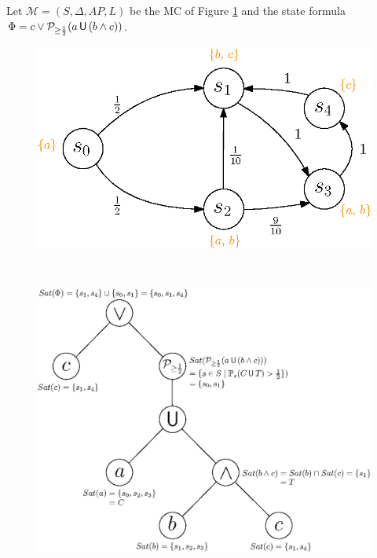 \begin{example} \label{exCUT}
  Let $\mathcal{M}=(S, \Delta, AP, L)$ be the MC of Figure \ref{CUTexample2} and the state formula $\Phi = c \vee \mathcal{P}_{\geq \frac{1}{2}}(a \,\text{\sffamily U}\, (b \wedge c))$.
  \begin{figure}[H]
  \begin{minipage}{0.4\linewidth}
    \centering
    \includegraphics[width=\linewidth]{resources/CUTexample2}
    \captionsetup{justification=centering}
    \label{CUTexample2}
  \end{minipage}
    $ \quad $
  \begin{minipage}{0.6\linewidth}
    \centering
    \includegraphics[width=\linewidth]{resources/parse-tree}

\end{minipage}
\end{figure}
\end{example}
